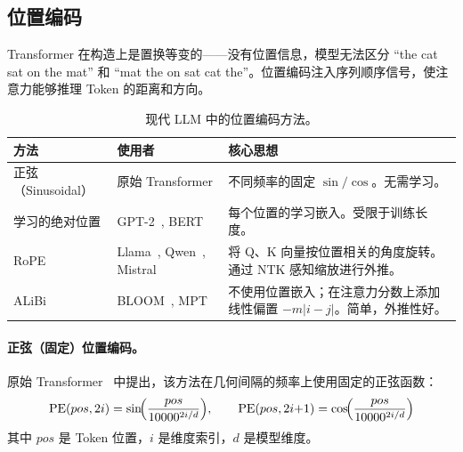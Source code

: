 \subsection{位置编码}
\label{positional-encodings}

Transformer 在构造上是置换等变的——没有位置信息，模型无法区分 ``the cat sat on the mat'' 和 ``mat the on sat cat the''。位置编码注入序列顺序信号，使注意力能够推理 Token 的距离和方向。

\begin{table}[ht!]
\centering\small
\caption{现代 LLM 中的位置编码方法。}
\noindent\begin{tabularx}{\linewidth}{@{}l Z{0.76} Z{1.24}@{}}
\toprule
\textbf{方法} & \textbf{使用者} & \textbf{核心思想} \\
\midrule
正弦（Sinusoidal） & 原始 Transformer & 不同频率的固定 $\sin/\cos$。无需学习。 \\
学习的绝对位置 & GPT-2~\cite{radford2019gpt2}, BERT~\cite{devlin2019bert} & 每个位置的学习嵌入。受限于训练长度。 \\
RoPE & Llama~\cite{grattafiori2024llama3}, Qwen~\cite{qwen2024qwen25}, Mistral~\cite{jiang2023mistral} & 将 Q、K 向量按位置相关的角度旋转。通过 NTK 感知缩放进行外推。 \\
ALiBi & BLOOM~\cite{workshop2023bloom}, MPT~\cite{mosaicml2023mpt} & 不使用位置嵌入；在注意力分数上添加线性偏置 $-m|i-j|$。简单，外推性好。 \\
\bottomrule
\end{tabularx}
\end{table}

\paragraph{正弦（固定）位置编码。}
\label{sinusoidal-fixed-positional-encoding.}

原始 Transformer~\cite{vaswani2017attention} 中提出，该方法在几何间隔的频率上使用固定的正弦函数：
\[
\text{PE}(pos, 2i) = \sin\!\Bigl(\frac{pos}{10000^{2i/d}}\Bigr), \qquad
  \text{PE}(pos, 2i{+}1) = \cos\!\Bigl(\frac{pos}{10000^{2i/d}}\Bigr)
\]
其中 $pos$ 是 Token 位置，$i$ 是维度索引，$d$ 是模型维度。

